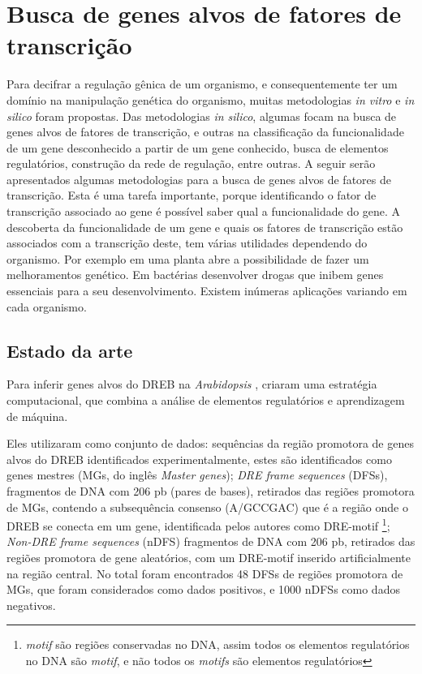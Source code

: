\chapter{Busca de genes alvos de fatores de transcrição}

Para decifrar a regulação gênica de um organismo, e consequentemente ter um domínio na manipulação genética do organismo, muitas metodologias \textit{in vitro} e \textit{in silico} foram propostas. Das metodologias \textit{in silico}, algumas focam na busca de genes alvos de fatores de transcrição, e outras na classificação da funcionalidade de um gene desconhecido a partir de um gene conhecido, busca de elementos regulatórios, construção da rede de regulação, entre outras. A seguir serão apresentados algumas metodologias para a busca de genes alvos de fatores de transcrição. Esta é uma tarefa importante, porque identificando o fator de transcrição associado ao gene é possível saber qual a funcionalidade do gene. A descoberta da funcionalidade de um gene e quais os fatores de transcrição estão associados com a transcrição deste, tem várias utilidades dependendo do organismo. Por exemplo em uma planta abre a possibilidade de fazer um melhoramentos genético. Em bactérias desenvolver drogas que inibem genes essenciais para a seu desenvolvimento. Existem inúmeras aplicações variando em cada organismo.

\section{Estado da arte}
Para inferir genes alvos do DREB na \textit{Arabidopsis} \cite{Wang2009}, criaram uma estratégia computacional, que combina a análise de elementos regulatórios e aprendizagem de máquina.

Eles utilizaram como conjunto de dados: sequências da região promotora de genes alvos do DREB identificados experimentalmente, estes são identificados como genes mestres (MGs, do inglês \textit{Master genes}); \textit{DRE frame sequences} (DFSs), fragmentos de DNA com 206 pb (pares de bases), retirados das regiões promotora de MGs, contendo a subsequência consenso (A/GCCGAC) que é a região onde o DREB se conecta em um gene, identificada pelos autores como DRE-motif \footnote{\textit{motif} são regiões conservadas no DNA, assim todos os elementos regulatórios no DNA são \textit{motif}, e não todos os \textit{motifs} são elementos regulatórios}; \textit{Non-DRE frame sequences} (nDFS) fragmentos de DNA com 206 pb, retirados das regiões promotora de gene aleatórios, com um DRE-motif inserido artificialmente na região central. No total foram encontrados 48 DFSs de regiões promotora de MGs, que foram considerados como dados positivos, e 1000 nDFSs como dados negativos.

